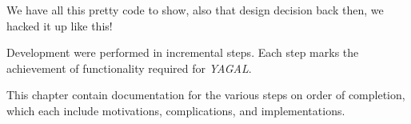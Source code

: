 We have all this pretty code to show, also that design decision back then, we hacked it up like this!

Development were performed in incremental steps. Each step marks the achievement of functionality required for \textit{YAGAL}.


This chapter contain documentation for the various steps on order of completion, which each include motivations, complications, and implementations.